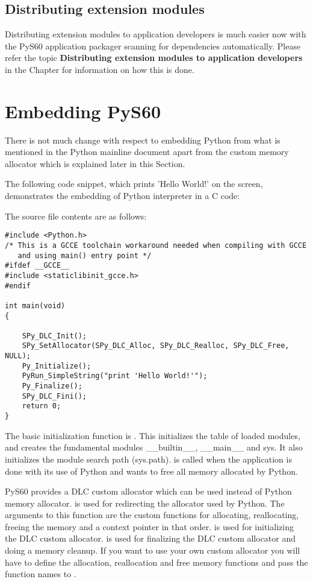
\subsection{Distributing extension modules}
\label{subsec:distributeextmodules}
Distributing extension modules to application developers is much easier now with
the PyS60 application packager scanning for dependencies automatically. Please
refer the topic {\bf Distributing extension modules to application developers}
in the Chapter  for information on how this is done.

\section{Embedding PyS60}
\label{sec:embedPyS60}
There is not much change with respect to embedding Python from what is mentioned in the
Python mainline document apart from the custom memory allocator which is explained
later in this Section.

The following code snippet, which prints 'Hello World!' on the screen,
demonstrates the embedding of Python interpreter in a C code:

The source file contents are as follows:
\begin{verbatim}
#include <Python.h>
/* This is a GCCE toolchain workaround needed when compiling with GCCE
   and using main() entry point */
#ifdef __GCCE__
#include <staticlibinit_gcce.h>
#endif

int main(void)
{

    SPy_DLC_Init();
    SPy_SetAllocator(SPy_DLC_Alloc, SPy_DLC_Realloc, SPy_DLC_Free, NULL);
    Py_Initialize();
    PyRun_SimpleString("print 'Hello World!'");
    Py_Finalize();
    SPy_DLC_Fini();
    return 0;
}
\end{verbatim}

The basic initialization function is . This initializes
the table of loaded modules, and creates the fundamental modules __builtin__,
__main__ and sys. It also initializes the module search path (sys.path).
 is called when the application is done with its use of
Python and wants to free all memory allocated by Python.

PyS60 provides a DLC custom allocator which can be used instead of Python memory allocator.
 is used for redirecting the allocator used by
Python. The arguments to this function are the custom functions for allocating,
reallocating, freeing the memory and a context pointer in that order. 
is used for initializing the DLC custom allocator.  is used
for finalizing the DLC custom allocator and doing a memory cleanup. If you want to use
your own custom allocator you will have to define the allocation, reallocation
and free memory functions and pass the function names to .

